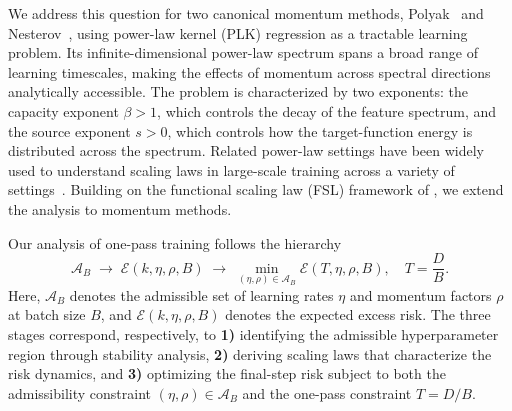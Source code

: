 \documentclass[11pt]{article}
\begin{document}
We address this question for two canonical momentum methods, Polyak~\citep{polyak1964some} and Nesterov~\citep{nesterov1983method}, using power-law kernel (PLK) regression as a tractable learning problem. Its infinite-dimensional power-law spectrum spans a broad range of learning timescales, making the effects of momentum across spectral directions analytically accessible. The problem is characterized by two exponents: the capacity exponent $\beta>1$, which controls the decay of the feature spectrum, and the source exponent $s>0$, which controls how the target-function energy is distributed across the spectrum. Related power-law settings have been widely used to understand scaling laws in large-scale training across a variety of settings~\citep{lin2024scaling,bahri2024explaining,bordelon2025feature,li2026functional,wang2026fast,li2026optimal}. Building on the functional scaling law (FSL) framework of \citet{li2026functional}, we extend the analysis to momentum methods.


Our analysis of one-pass training follows the hierarchy 
\[ 
\mathcal A_B \;\longrightarrow\; \mathcal E(k,\eta,\rho,B) \;\longrightarrow\; \min_{(\eta,\rho)\in\mathcal A_B} \mathcal E\!\left(T,\eta,\rho,B\right),\quad T=\frac{D}{B}. 
\] 
Here, $\mathcal A_B$ denotes the admissible set of learning rates $\eta$ and momentum factors $\rho$ at batch size $B$, and $\mathcal E(k,\eta,\rho,B)$ denotes the expected excess risk. The three stages correspond, respectively, to \textbf{1)} identifying the admissible hyperparameter region through stability analysis, \textbf{2)} deriving scaling laws that characterize the risk dynamics, and \textbf{3)} optimizing the final-step risk subject to both the admissibility constraint $(\eta,\rho)\in\mathcal A_B$ and the one-pass constraint $T=D/B$.

\vspace{-.7em}
\end{document}
